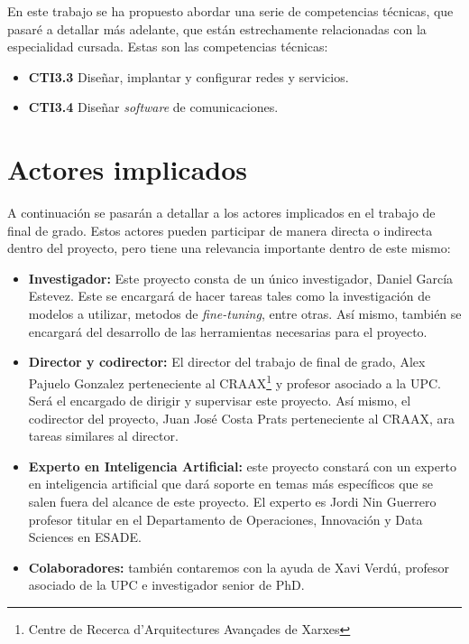En este trabajo se ha propuesto abordar una serie de competencias técnicas, que
pasaré a detallar más adelante, que están estrechamente relacionadas con la
especialidad cursada. Estas son las competencias técnicas:

\begin{itemize}
    \item \textbf{CTI3.3} Diseñar, implantar y configurar redes y servicios.
    \item \textbf{CTI3.4} Diseñar \textit{software} de comunicaciones.
\end{itemize}

\section{Actores implicados}
\label{sec:actores}


A continuación se pasarán a detallar a los actores implicados en el trabajo de final
de grado. Estos actores pueden participar de manera directa o indirecta dentro del
proyecto, pero tiene una relevancia importante dentro de este mismo:

\begin{itemize}
    \item \textbf{Investigador:} Este proyecto consta de un único investigador, Daniel
        García Estevez. Este se encargará de hacer tareas tales como la investigación
        de modelos a utilizar, metodos de \textit{fine-tuning}, entre otras. Así mismo,
        también se encargará del desarrollo de las herramientas necesarias para el proyecto.
    \item \textbf{Director y codirector:} El director del trabajo de final de grado, Alex
        Pajuelo Gonzalez perteneciente al CRAAX\footnote{Centre de Recerca d'Arquitectures
        Avançades de Xarxes} y profesor asociado a la UPC. Será el encargado de dirigir y
        supervisar este proyecto. Así mismo, el codirector del proyecto, Juan José Costa Prats
        perteneciente al CRAAX, ara tareas similares al director.
    \item \textbf{Experto en Inteligencia Artificial:} este proyecto constará con un experto en
        inteligencia artificial que dará soporte en temas más específicos que se salen fuera del
        alcance de este proyecto. El experto es Jordi Nin Guerrero profesor titular en el
        Departamento de Operaciones, Innovación y Data Sciences en ESADE.
    \item \textbf{Colaboradores:} también contaremos con la ayuda de Xavi Verdú, profesor asociado
        de la UPC e investigador senior de PhD.
\end{itemize}